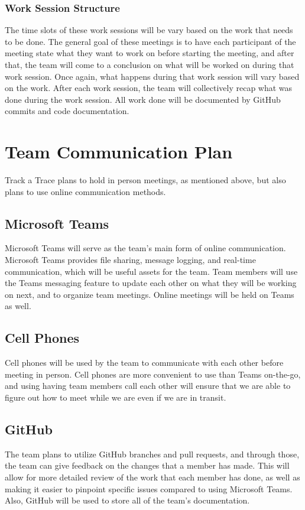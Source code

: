 \documentclass{article}
\begin{document}
\subsubsection{Work Session Structure}
The time slots of these work sessions will be vary based on the work that needs to be done. The general goal of these meetings is to have each participant of the meeting state what they want to work on before starting the meeting, and after that, the team will come to a conclusion on what will be worked on during that work session. Once again, what happens during that work session will vary based on the work. After each work session, the team will collectively recap what was done during the work session. All work done will be documented by GitHub commits and code documentation.

\section{Team Communication Plan}
Track a Trace plans to hold in person meetings, as mentioned above, but also plans to use online communication methods.

\subsection{Microsoft Teams}
Microsoft Teams will serve as the team's main form of online communication. Microsoft Teams provides file sharing, message logging, and real-time communication, which will be useful assets for the team. Team members will use the Teams messaging feature to update each other on what they will be working on next, and to organize team meetings. Online meetings will be held on Teams as well.

\subsection{Cell Phones}
Cell phones will be used by the team to communicate with each other before meeting in person. Cell phones are more convenient to use than Teams on-the-go, and using having team members call each other will ensure that we are able to figure out how to meet while we are even if we are in transit.

\subsection{GitHub}
The team plans to utilize GitHub branches and pull requests, and through those, the team can give feedback on the changes that a member has made. This will allow for more detailed review of the work that each member has done, as well as making it easier to pinpoint specific issues compared to using Microsoft Teams. Also, GitHub will be used to store all of the team's documentation.
\end{document}
